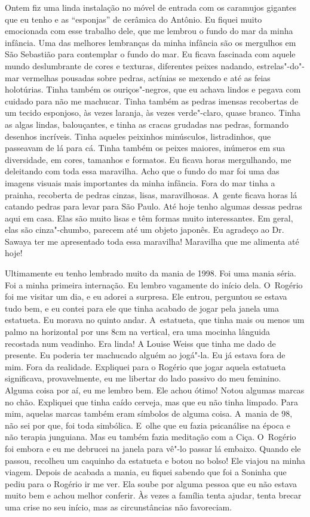Ontem fiz uma linda instalação no móvel de entrada com os caramujos
gigantes que eu tenho e as ``esponjas'' de cerâmica do Antônio. Eu
fiquei muito emocionada com esse trabalho dele, que me lembrou o fundo
do mar da minha infância. Uma das melhores lembranças da minha infância
são os mergulhos em São Sebastião para contemplar o fundo do mar. Eu
ficava fascinada com aquele mundo deslumbrante de cores e texturas,
diferentes peixes nadando, estrelas"-do"-mar vermelhas pousadas sobre
pedras, actínias se mexendo e até as feias holotúrias. Tinha também os
ouriços"-negros, que eu achava lindos e pegava com cuidado para não me
machucar. Tinha também as pedras imensas recobertas de um tecido
esponjoso, às vezes laranja, às vezes verde"-claro, quase branco. Tinha
as algas lindas, balouçantes, e tinha as cracas grudadas nas pedras,
formando desenhos incríveis. Tinha aqueles peixinhos minúsculos,
listradinhos, que passeavam de lá para cá. Tinha também os peixes
maiores, inúmeros em sua diversidade, em cores, tamanhos e formatos. Eu
ficava horas mergulhando, me deleitando com toda essa maravilha. Acho
que o fundo do mar foi uma das imagens visuais mais importantes da minha
infância. Fora do mar tinha a prainha, recoberta de pedras cinzas,
lisas, maravilhosas. A~gente ficava horas lá catando pedras para levar
para São Paulo. Até hoje tenho algumas dessas pedras aqui em casa. Elas
são muito lisas e têm formas muito interessantes. Em geral, elas são
cinza"-chumbo, parecem até um objeto japonês. Eu agradeço ao Dr. Sawaya
ter me apresentado toda essa maravilha! Maravilha que me alimenta até
hoje!

Ultimamente eu tenho lembrado muito da mania de 1998. Foi uma mania
séria. Foi a minha primeira internação. Eu lembro vagamente do início
dela. O~Rogério foi me visitar um dia, e eu adorei a surpresa. Ele
entrou, perguntou se estava tudo bem, e eu contei para ele que tinha
acabado de jogar pela janela uma estatueta. Eu morava no quinto andar. A~estatueta, que tinha mais ou menos um palmo na horizontal por uns 8cm na
vertical, era uma mocinha lânguida recostada num veadinho. Era linda! A
Louise Weiss que tinha me dado de presente. Eu poderia ter machucado
alguém ao jogá"-la. Eu já estava fora de mim. Fora da realidade.
Expliquei para o Rogério que jogar aquela estatueta significava,
provavelmente, eu me libertar do lado passivo do meu feminino. Alguma
coisa por aí, eu me lembro bem. Ele achou ótimo! Notou algumas marcas no
chão. Expliquei que tinha caído cerveja, mas que eu não tinha limpado.
Para mim, aquelas marcas também eram símbolos de alguma coisa. A~mania
de 98, não sei por que, foi toda simbólica. E~olhe que eu fazia
psicanálise na época e não terapia junguiana. Mas eu também fazia
meditação com a Ciça. O~Rogério foi embora e eu me debrucei na janela
para vê"-lo passar lá embaixo. Quando ele passou, recolheu um caquinho da
estatueta e botou no bolso! Ele viajou na minha viagem. Depois de
acabada a mania, eu fiquei sabendo que foi a Soninha que pediu para o
Rogério ir me ver. Ela soube por alguma pessoa que eu não estava muito
bem e achou melhor conferir. Às vezes a família tenta ajudar, tenta
brecar uma crise no seu início, mas as circunstâncias não favoreciam.

